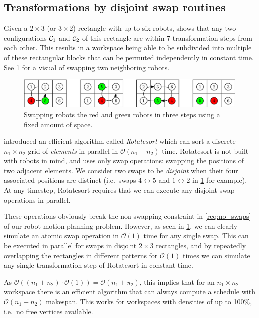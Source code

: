 \subsection{Transformations by disjoint swap routines}\label{alg:rotatesort}

Given a \(2 \times 3\) (or \(3 \times 2\)) rectangle with up to six robots, \cite{siamcomp/DemaineFKMS19} shows that any two configurations \(\mathcal{C}_{1}\) and \(\mathcal{C}_{2}\) of this rectangle are within 7 transformation steps from each other.
This results in a workspace being able to be subdivided into multiple of these rectangular blocks that can be permuted independently in constant time.
See \cref{fig:swap3} for a visual of swapping two neighboring robots.

\begin{figure}[h]
	\centering
	\includegraphics[width=0.8\linewidth]{ipe/swap_ex.eps}
	\caption{
		Swapping robots the red and green robots in three steps using a fixed amount of space.
	}\label{fig:swap3}
\end{figure}

\cite{algorithmica/MarbergG88} introduced an efficient algorithm called \emph{Rotatesort} which can sort a discrete \(n_1 \times n_2\) grid of \emph{elements} in parallel in \(\mathcal{O}(n_1 + n_2)\) time.
Rotatesort is not built with robots in mind, and uses only swap operations: swapping the positions of two adjacent elements.
We consider two swaps to be \emph{disjoint} when their four associated positions are distinct (i.e.~swaps \(4 \leftrightarrow 5\) and \(1 \leftrightarrow 2\) in \cref{fig:swap3} for example).
At any timestep, Rotatesort requires that we can execute any disjoint swap operations in parallel.

These operations obviously break the non-swapping constraint in \cref{req:no_swaps} of our robot motion planning problem. 
However, as seen in \cref{fig:swap3}, we can clearly simulate an atomic swap operation in \(\mathcal{O}(1)\) time for any single swap.
This can be executed in parallel for swaps in disjoint \(2 \times 3\) rectangles, and by repeatedly overlapping the rectangles in different patterns for \(\mathcal{O}(1)\) times we can simulate any single transformation step of Rotatesort in constant time.

As \(\mathcal{O}((n_1 + n_2) \cdot \mathcal{O}(1)) = \mathcal{O}(n_1 + n_2)\), this implies that for an \(n_1 \times n_2\) workspace there is an efficient algorithm that can always compute a schedule with \(\mathcal{O}(n_1 + n_2)\) makespan. 
This works for workspaces with densities of up to 100\%, i.e.~no free vertices available.

